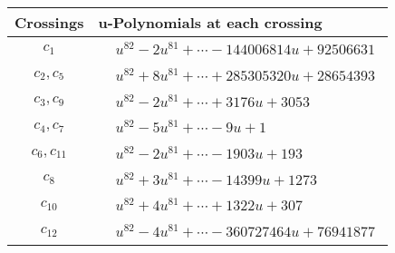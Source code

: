 \documentclass[1p]{elsarticle_modified}
\theoremstyle{definition}
\begin{document}
\begin{tabular}{m{50pt}|m{274pt}}
Crossings & \hspace{64pt}u-Polynomials at each crossing \\
\hline $$\begin{aligned}c_{1}\end{aligned}$$&$\begin{aligned}
&u^{82}-2 u^{81}+\cdots-144006814 u+92506631
\end{aligned}$\\
\hline $$\begin{aligned}c_{2},c_{5}\end{aligned}$$&$\begin{aligned}
&u^{82}+8 u^{81}+\cdots+285305320 u+28654393
\end{aligned}$\\
\hline $$\begin{aligned}c_{3},c_{9}\end{aligned}$$&$\begin{aligned}
&u^{82}-2 u^{81}+\cdots+3176 u+3053
\end{aligned}$\\
\hline $$\begin{aligned}c_{4},c_{7}\end{aligned}$$&$\begin{aligned}
&u^{82}-5 u^{81}+\cdots-9 u+1
\end{aligned}$\\
\hline $$\begin{aligned}c_{6},c_{11}\end{aligned}$$&$\begin{aligned}
&u^{82}-2 u^{81}+\cdots-1903 u+193
\end{aligned}$\\
\hline $$\begin{aligned}c_{8}\end{aligned}$$&$\begin{aligned}
&u^{82}+3 u^{81}+\cdots-14399 u+1273
\end{aligned}$\\
\hline $$\begin{aligned}c_{10}\end{aligned}$$&$\begin{aligned}
&u^{82}+4 u^{81}+\cdots+1322 u+307
\end{aligned}$\\
\hline $$\begin{aligned}c_{12}\end{aligned}$$&$\begin{aligned}
&u^{82}-4 u^{81}+\cdots-360727464 u+76941877
\end{aligned}$\\
\hline
\end{tabular}\\~\\
\end{document}
